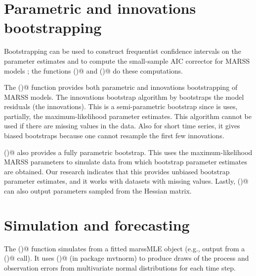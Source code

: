 \section{Parametric and innovations bootstrapping}
Bootstrapping can be used to construct frequentist confidence intervals on the parameter estimates \citep{StofferWall1991} and to compute the small-sample AIC corrector for MARSS models \citep{CavanaughShumway1997}; the functions \verb@MARSSparamCIs()@ and \verb@MARSSaic()@ do these computations. 

The \verb@MARSSboot()@ function provides both parametric and innovations bootstrapping of MARSS models.  
The innovations bootstrap algorithm by \citet{StofferWall1991}  bootstraps the model residuals (the innovations).  This is a semi-parametric bootstrap since is uses, partially, the maximum-likelihood parameter estimates.  This algorithm cannot be used if there are missing values in the data.  Also for short time series, it gives biased bootstraps because one cannot resample the first few innovations.  

\verb@MARSSboot()@ also provides a fully parametric bootstrap.  This uses the maximum-likelihood MARSS parameters to simulate data from which bootstrap parameter estimates are obtained.  Our research \citep{HolmesWard2010} indicates that this provides unbiased bootstrap parameter estimates, and it works with datasets with missing values.  Lastly, \verb@MARSSboot()@ can also output parameters sampled from the Hessian matrix.  

\section{Simulation and forecasting}
The \verb@MARSSsimulate()@ function simulates from a fitted marssMLE object (e.g., output from a \verb@MARSS()@ call).  It uses \verb@rmvnorm()@ (in package mvtnorm) to produce draws of the process and observation errors from multivariate normal distributions for each time step.  


